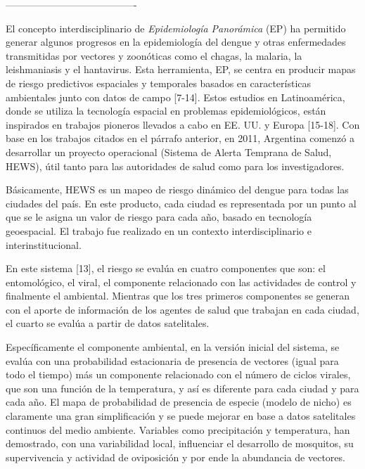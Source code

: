 ----------------------------------------

El concepto interdisciplinario de \textit{Epidemiología Panorámica} (EP)
ha permitido generar algunos progresos en la epidemiología del dengue y otras
enfermedades transmitidas por vectores y zoonóticas como el chagas, la
malaria, la leishmaniasis y el hantavirus. Esta herramienta, EP, se centra en
producir mapas de riesgo predictivos espaciales y temporales basados en
características ambientales junto con datos de campo [7-14].
Estos estudios en Latinoamérica, donde se utiliza la tecnología espacial en
problemas epidemiológicos, están inspirados en trabajos pioneros llevados a cabo
en EE. UU. y Europa [15-18].
Con base en los trabajos citados en el párrafo anterior, en 2011, Argentina
comenzó a desarrollar un proyecto operacional
(Sistema de Alerta Temprana de Salud, HEWS), útil tanto para las autoridades de
salud como para los investigadores.


Básicamente, HEWS es un mapeo de riesgo dinámico del dengue para todas las
ciudades del país. En este producto, cada ciudad es representada por un punto
al que se le asigna un valor de riesgo para cada año, basado en tecnología
geoespacial. El trabajo fue realizado en un contexto interdisciplinario e
interinstitucional.

En este sistema [13], el riesgo se evalúa en cuatro componentes que son: el
entomológico, el viral, el componente relacionado con las actividades de
control y finalmente el ambiental. Mientras que los tres primeros componentes
se generan con el aporte de información de los agentes de salud que trabajan en cada
ciudad, el cuarto se evalúa a partir de datos satelitales.

Específicamente el componente ambiental, en la versión inicial del sistema, se
evalúa con una probabilidad estacionaria de presencia de vectores (igual para
todo el tiempo) más un componente relacionado con el número de ciclos virales,
que son una función de la temperatura, y así es diferente para cada ciudad y
para cada año. El mapa de probabilidad de presencia de especie (modelo de nicho)
es claramente una gran simplificación y se puede mejorar en base a datos
satelitales continuos del medio ambiente. Variables como precipitación y
temperatura, han demostrado, con una variabilidad local, influenciar el
desarrollo de mosquitos, su supervivencia y actividad de oviposición y por ende
la abundancia de vectores.

